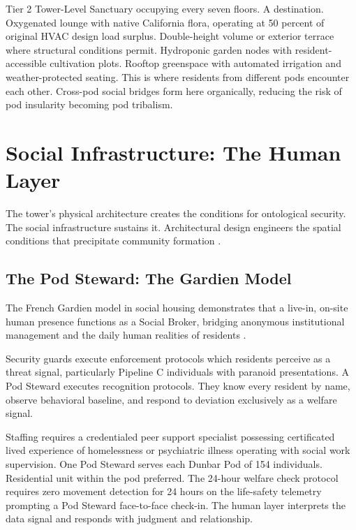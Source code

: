 \documentclass[12pt, letterpaper]{article}
\begin{document}
Tier 2 Tower-Level Sanctuary occupying every seven floors. A destination. Oxygenated lounge with native California flora, operating at 50 percent of original HVAC design load surplus. Double-height volume or exterior terrace where structural conditions permit. Hydroponic garden nodes with resident-accessible cultivation plots. Rooftop greenspace with automated irrigation and weather-protected seating. This is where residents from different pods encounter each other. Cross-pod social bridges form here organically, reducing the risk of pod insularity becoming pod tribalism.

\clearpage
\section{Social Infrastructure: The Human Layer}

The tower's physical architecture creates the conditions for ontological security. The social infrastructure sustains it. Architectural design engineers the spatial conditions that precipitate community formation \citep{frontiers_acoustic_2024}.

\subsection{The Pod Steward: The Gardien Model}

The French Gardien model in social housing demonstrates that a live-in, on-site human presence functions as a Social Broker, bridging anonymous institutional management and the daily human realities of residents \citep{harvard_gsd_gardien, tu_eindhoven_2024}.

Security guards execute enforcement protocols which residents perceive as a threat signal, particularly Pipeline C individuals with paranoid presentations. A Pod Steward executes recognition protocols. They know every resident by name, observe behavioral baseline, and respond to deviation exclusively as a welfare signal.

Staffing requires a credentialed peer support specialist possessing certificated lived experience of homelessness or psychiatric illness operating with social work supervision. One Pod Steward serves each Dunbar Pod of 154 individuals. Residential unit within the pod preferred. The 24-hour welfare check protocol requires zero movement detection for 24 hours on the life-safety telemetry prompting a Pod Steward face-to-face check-in. The human layer interprets the data signal and responds with judgment and relationship.
\end{document}
